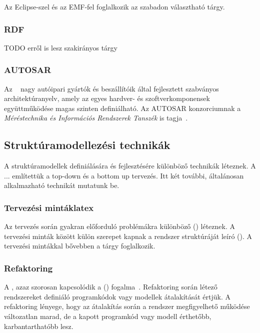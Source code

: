 Az Eclipse-szel és az EMF-fel foglalkozik az \eat szabadon választható tárgy.

\subsubsection{RDF}


TODO erről is lesz szakirányos tárgy

\subsubsection{AUTOSAR}

Az ~\cite{autosar} nagy autóipari gyártók és beszállítóik által fejlesztett szabványos architektúranyelv, amely az egyes hardver- és szoftverkomponensek együttműködése magas szinten definiálható. Az AUTOSAR konzorciumnak a \emph{Méréstechnika és Információs Rendszerek Tanszék} is tagja~\cite{autosar-attendees}.

\subsection{Struktúramodellezési technikák}

A struktúramodellek definiálására és fejlesztésére különböző technikák léteznek. A ... említettük a top-down és a bottom up tervezés. Itt két további, általánosan alkalmazható technikát mutatunk be.

\subsubsection{Tervezési mintáklatex }

Az  tervezés során gyakran előforduló problémákra különböző  () léteznek. A tervezési minták között külön szerepet kapnak a rendszer struktúráját leíró  (). A tervezési mintákkal bővebben a \sznikak tárgy foglalkozik.

\subsubsection{Refaktoring}

A , azaz  szorosan kapcsolódik a  () fogalma~\cite{fowler2012refactoring}. Refaktoring során létező rendszereket definiáló programkódok vagy modellek átalakítását értjük. A refaktoring lényege, hogy az átalakítás során a rendszer megfigyelhető működése változatlan marad, de a kapott programkód vagy modell érthetőbb, karbantarthatóbb lesz.

